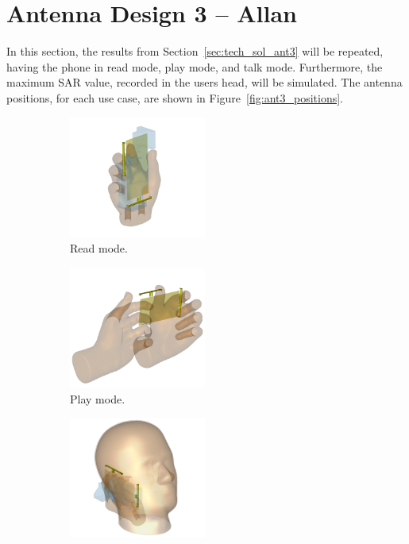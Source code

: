 \section{Antenna Design 3 -- Allan}
In this section, the results from Section~\ref{sec:tech_sol_ant3} will be repeated, having the phone in read mode, play mode, and talk mode. Furthermore, the maximum SAR value, recorded in the users head, will be simulated. The antenna positions, for each use case, are shown in Figure~\ref{fig:ant3_positions}.

\begin{figure}[htbp]
    \centering
    \begin{subfigure}[b]{0.24\linewidth}
        \centering
        \includegraphics[width=\linewidth,height=4cm,keepaspectratio]{img/tech_sol/nonresonant/simulation/read_mode/3d}
        \caption{Read mode.}
    \end{subfigure}
    \begin{subfigure}[b]{0.24\linewidth}
        \centering
        \includegraphics[width=\linewidth,height=4cm,keepaspectratio]{img/tech_sol/nonresonant/simulation/play_mode/3d}
        \caption{Play mode.}
    \end{subfigure}
    \begin{subfigure}[b]{0.24\linewidth}
        \centering
        \includegraphics[width=\linewidth,height=4cm,keepaspectratio]{img/tech_sol/nonresonant/simulation/talk_mode/3d}

\end{subfigure}
\end{figure}
